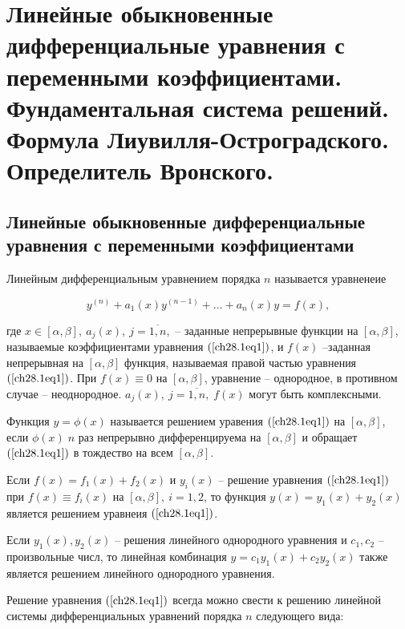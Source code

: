\chapter{Линейные обыкновенные дифференциальные уравнения с переменными коэффициентами. Фундаментальная система решений. Формула Лиувилля-Остроградского. Определитель Вронского.}

\section{Линейные обыкновенные дифференциальные уравнения с переменными коэффициентами}

Линейным дифференциальным уравнением порядка $n$ называется уравненеие 

\begin{equation} \label{ch28.1eq1}
y^{(n)} + a_1(x)y^{(n - 1)} + \ldots + a_n(x)y = f(x),
\end{equation}

где $x \in [\alpha, \beta], \: a_j(x), \: j = \overline{1,n},$ -- заданные непрерывные функции на $[\alpha, \beta]$, называемые коэффициентами уравнения $(\ref{ch28.1eq1})$, и $f(x)$ --заданная непрерывная на $[\alpha, \beta]$ функция, называемая правой частью уравнения $(\ref{ch28.1eq1})$. При $f(x) \equiv 0$ на $[\alpha, \beta]$, уравнение -- однородное, в противном случае -- неоднородное. $a_j(x), \: j = \overline{1,n}, \; f(x)$ могут быть комплексными.

Функция $y = \phi(x)$ называется решением уравения $(\ref{ch28.1eq1})$ на $[\alpha, \beta]$, если $\phi(x) \; n$ раз непрерывно дифференцируема на $[\alpha, \beta]$ и обращает $(\ref{ch28.1eq1})$ в тождество на всем $[\alpha, \beta]$.

\begin{lemm}
Если $f(x) = f_1(x) + f_2(x)$ и $y_i(x)$ -- решение уравнения $(\ref{ch28.1eq1})$ при $f(x) \equiv f_i(x)$ на $[\alpha, \beta], \: i = 1,2$, то функция $y(x) = y_1(x) + y_2(x)$ является решением уравнеия $(\ref{ch28.1eq1})$.
\end{lemm}  

\begin{cons}
Если $y_1(x), y_2(x)$ -- решения линейного однородного уравнения и $c_1, c_2$ -- произвольные числ, то линейная комбинация $y = c_1y_1(x) + c_2y_2(x)$ также является решением линейного однородного уравнения.
\end{cons}

Решение уравнения $(\ref{ch28.1eq1})$ всегда можно свести к решению линейной системы дифференциальных уравнений порядка $n$ следующего вида:

